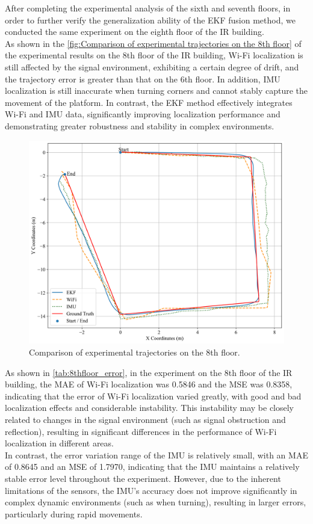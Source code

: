 \documentclass[12pt,a4paper]{article}
\numberwithin{equation}{section}
\begin{document}
\noindent After completing the experimental analysis of the sixth and seventh floors, in order to further verify the generalization ability of the EKF fusion method, we conducted the same experiment on the eighth floor of the IR building.\\
As shown in the \autoref{fig:Comparison of experimental trajectories on the 8th floor} of the experimental results on the 8th floor of the IR building, Wi-Fi localization is still affected by the signal environment, exhibiting a certain degree of drift, and the trajectory error is greater than that on the 6th floor. In addition, IMU localization is still inaccurate when turning corners and cannot stably capture the movement of the platform. In contrast, the EKF method effectively integrates Wi-Fi and IMU data, significantly improving localization performance and demonstrating greater robustness and stability in complex environments.
\begin{figure}[H]
    \centering
    \includegraphics[width=0.7\linewidth]{images/1/1.png}
    \caption{Comparison of experimental trajectories on the 8th floor.}
    \label{fig:Comparison of experimental trajectories on the 8th floor}
\end{figure}
\noindent As shown in \autoref{tab:8thfloor_error}, in the experiment on the 8th floor of the IR building, the MAE of Wi-Fi localization was 0.5846 and the MSE was 0.8358, indicating that the error of Wi-Fi localization varied greatly, with good and bad localization effects and considerable instability. This instability may be closely related to changes in the signal environment (such as signal obstruction and reflection), resulting in significant differences in the performance of Wi-Fi localization in different areas.\\
In contrast, the error variation range of the IMU is relatively small, with an MAE of 0.8645 and an MSE of 1.7970, indicating that the IMU maintains a relatively stable error level throughout the experiment. However, due to the inherent limitations of the sensors, the IMU's accuracy does not improve significantly in complex dynamic environments (such as when turning), resulting in larger errors, particularly during rapid movements.
\end{document}
